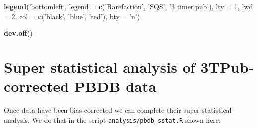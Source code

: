 \documentclass[]{article}
\newenvironment{Shaded}{\begin{snugshade}}{\end{snugshade}}
\newcommand{\KeywordTok}[1]{\textcolor[rgb]{0.13,0.29,0.53}{\textbf{#1}}}
\newcommand{\DataTypeTok}[1]{\textcolor[rgb]{0.13,0.29,0.53}{#1}}
\newcommand{\DecValTok}[1]{\textcolor[rgb]{0.00,0.00,0.81}{#1}}
\newcommand{\StringTok}[1]{\textcolor[rgb]{0.31,0.60,0.02}{#1}}
\newcommand{\NormalTok}[1]{#1}
\begin{document}
\begin{Shaded}
\begin{Highlighting}[]
\KeywordTok{legend}\NormalTok{(}\StringTok{'bottomleft'}\NormalTok{, }\DataTypeTok{legend =} \KeywordTok{c}\NormalTok{(}\StringTok{'Rarefaction'}\NormalTok{, }\StringTok{'SQS'}\NormalTok{, }\StringTok{'3 timer pub'}\NormalTok{), }
       \DataTypeTok{lty =} \DecValTok{1}\NormalTok{, }\DataTypeTok{lwd =} \DecValTok{2}\NormalTok{, }\DataTypeTok{col =} \KeywordTok{c}\NormalTok{(}\StringTok{'black'}\NormalTok{, }\StringTok{'blue'}\NormalTok{, }\StringTok{'red'}\NormalTok{), }\DataTypeTok{bty =} \StringTok{'n'}\NormalTok{)}

\KeywordTok{dev.off}\NormalTok{()}
\end{Highlighting}
\end{Shaded}

\section{Super statistical analysis of 3TPub-corrected PBDB
data}\label{super-statistical-analysis-of-3tpub-corrected-pbdb-data}

Once data have been bias-corrected we can complete their
super-statistical analysis. We do that in the script
\texttt{analysis/pbdb\_sstat.R} shown here:
\end{document}
